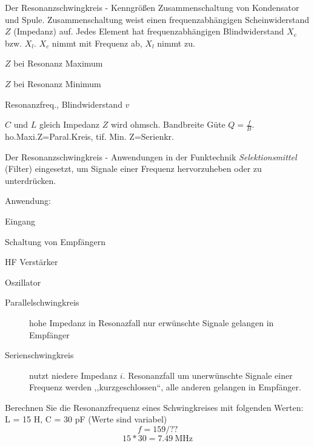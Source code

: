 \documentclass[avery5371,grid,frame,a4paper]{flashcards}
\newcommand{\card}[3]{
  \begin{flashcard}[{\chap} -- #1]{#2}#3\end{flashcard}
}
\begin{document}
\card{18}{Der Resonanzschwingkreis - Kenngrößen}{
  \small
  Zusammenschaltung von Kondensator und Spule. Zusammenschaltung weist einen frequenzabhängigen Scheinwiderstand $Z$ (Impedanz) auf. Jedes Element hat frequenzabhängigen Blindwiderstand $X_c$ bzw. $X_l$. $X_c$ nimmt mit Frequenz ab, $X_l$ nimmt zu.

  \begin{description}\itemsep0pt
    \item[Parallelschwingkreis] $Z$ bei Resonanz Maximum
    \item[Serienschwingkreis] $Z$ bei Resonanz Minimum
    \item[Kenngrößen] Resonanzfreq., Blindwiderstand $v$  %
  \end{description}

  $C$ und $L$ gleich Impedanz $Z$ wird ohmsch.
  Bandbreite Güte $Q = \frac{f}{B}$.
  ho.Maxi.Z=Paral.Kreis, 
  tif. Min. Z=Serienkr.
}
\card{19}{Der Resonanzschwingkreis - Anwendungen in der Funktechnik}{
  \small
  \emph{Selektionsmittel} (Filter) eingesetzt, um Signale einer Frequenz hervorzuheben oder zu unterdrücken.

  Anwendung:
  \begin{itemize*}\itemsep0pt
    \item Eingang
    \item Schaltung von Empfängern
    \item HF Verstärker
    \item Oszillator
  \end{itemize*}

  \begin{description}
    \item[Parallelschwingkreis] hohe Impedanz in Resonazfall nur erwünschte Signale gelangen in Empfänger
    \item[Serienschwingkreis] nutzt niedere Impedanz $i$. Resonanzfall um unerwünschte Signale einer Frequenz werden ,,kurzgeschlossen``,  alle anderen gelangen in Empfänger.
  \end{description}
}
\card{20}{Berechnen Sie die Resonanzfrequenz eines Schwingkreises mit folgenden Werten: L = 15 H, C = 30 pF (Werte sind variabel)}{
  \[ f = 159 / ??  \]
  \[ 15*30  =  \SI{7.49}{\mega\Hz} \]
}
\end{document}
